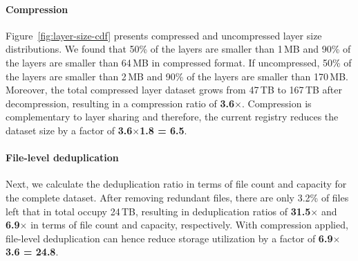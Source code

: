 %
%


%

\paragraph{Compression}
%
Figure~\ref{fig:layer-size-cdf} presents compressed and uncompressed layer size
distributions.
%
We found that 50\% of the layers are smaller than 1\,MB and 90\% of the layers are
smaller than 64\,MB in compressed format.
%
If uncompressed, 50\% of the layers are smaller than 2\,MB and 90\% of the
layers are smaller than 170\,MB.
%
Moreover, the total compressed layer dataset grows from 47\,TB to 167\,TB after
decompression, resulting in a compression ratio of \textbf{3.6$\times$}.
%
Compression is complementary to layer sharing and therefore, the current registry
reduces the dataset size by a factor of \textbf{3.6$\times$1.8 = 6.5}.


\paragraph{File-level deduplication}
%
%
Next, we calculate the deduplication ratio in terms of file count and capacity for
the complete dataset.
%
After removing redundant files, there are only 3.2\% of files left that in total occupy
24\,TB, resulting in deduplication ratios of \textbf{31.5$\times$} and
\textbf{6.9$\times$} in terms of file count and capacity, respectively.
%
With compression applied, file-level deduplication can hence reduce storage utilization
by a factor of \textbf{6.9$\times$3.6 = 24.8}.
%


